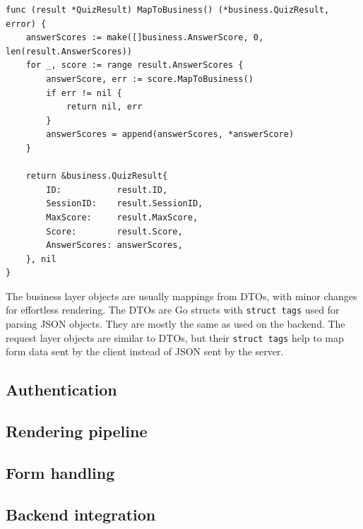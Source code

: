 \begin{lstlisting}[caption=Mapping from external to business,label=lst:mapping-example]
func (result *QuizResult) MapToBusiness() (*business.QuizResult, error) {
    answerScores := make([]business.AnswerScore, 0, len(result.AnswerScores))
    for _, score := range result.AnswerScores {
        answerScore, err := score.MapToBusiness()
        if err != nil {
            return nil, err
        }
        answerScores = append(answerScores, *answerScore)
    }

    return &business.QuizResult{
        ID:           result.ID,
        SessionID:    result.SessionID,
        MaxScore:     result.MaxScore,
        Score:        result.Score,
        AnswerScores: answerScores,
    }, nil
}
\end{lstlisting}

The business layer objects are usually mappings from DTOs, with minor changes for effortless rendering. The DTOs are Go structs with \texttt{struct tags} used for parsing JSON objects. They are mostly the same as used on the backend. The request layer objects are similar to DTOs, but their \texttt{struct tags} help to map form data sent by the client instead of JSON sent by the server.

\subsection{Authentication}

\subsection{Rendering pipeline}

\subsection{Form handling}

\subsection{Backend integration}